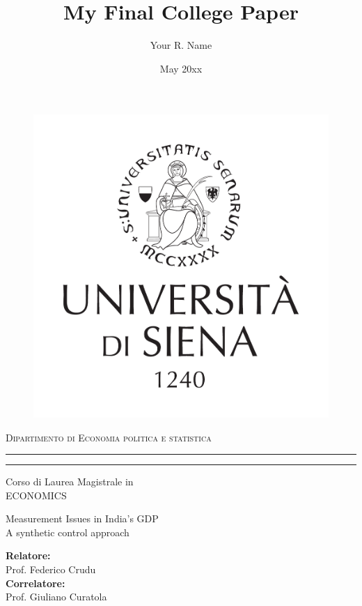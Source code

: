\documentclass[12pt,nobind, a4paper]{reedthesis}
\title{My Final College Paper}
\author{Your R. Name}
\date{May 20xx}
\begin{document}
	
		\begin{titlepage}
		\topmargin -2.5cm
	\end{titlepage}
	\begin{figure}[ht]
		\begin{center}
			\includegraphics[scale=.34]{unisilogo.pdf}
		\end{center}
	\end{figure}
	\begin{center}
		{{\Large{\textsc{Dipartimento di Economia politica e statistica}}}}
		\rule[0.1cm]{15.8cm}{0.1mm}
		\rule[0.5cm]{15.8cm}{0.6mm}
		\renewcommand*\rmdefault{cmss}
		Corso di Laurea Magistrale in \\ ECONOMICS 
	\end{center}
	\begin{center}
		\begin{huge}
			Measurement Issues in India's GDP\\
			\vspace{3mm}
			\Large A synthetic control approach
		\end{huge}
	\end{center}
	\vspace{12mm}
	\par
	\noindent
	\begin{minipage}[t]{0.55\textwidth}
		{\large{\textbf{Relatore:}\\
				Prof. Federico Crudu}\\
			\textbf{Correlatore:}\\
			Prof. Giuliano Curatola}
	\end{minipage}
\end{document}
